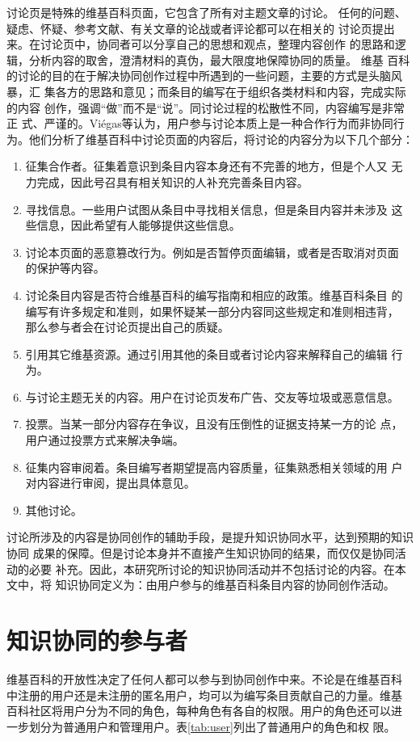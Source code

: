 讨论页是特殊的维基百科页面，它包含了所有对主题文章的讨论。
任何的问题、疑虑、怀疑、参考文献、有关文章的论战或者评论都可以在相关的
讨论页提出来。在讨论页中，协同者可以分享自己的思想和观点，整理内容创作
的思路和逻辑，分析内容的取舍，澄清材料的真伪，最大限度地保障协同的质量。
维基
百科的讨论的目的在于解决协同创作过程中所遇到的一些问题，主要的方式是头脑风暴，汇
集各方的思路和意见；而条目的编写在于组织各类材料和内容，完成实际的内容
创作，强调“做”而不是“说”。同讨论过程的松散性不同，内容编写是非常正
式、严谨的。Viégas等认为，用户参与讨论本质上是一种合作行为而非协同行
为\cite{985765}。他们分析了维基百科中讨论页面的内容后，将讨论的内容分为以下几个部分：
\begin{enumerate}
\item 征集合作者。征集着意识到条目内容本身还有不完善的地方，但是个人又
  无力完成，因此号召具有相关知识的人补充完善条目内容。
\item 寻找信息。一些用户试图从条目中寻找相关信息，但是条目内容并未涉及
  这些信息，因此希望有人能够提供这些信息。
\item 讨论本页面的恶意篡改行为。例如是否暂停页面编辑，或者是否取消对页面
  的保护等内容。
\item 讨论条目内容是否符合维基百科的编写指南和相应的政策。维基百科条目
  的编写有许多规定和准则，如果怀疑某一部分内容同这些规定和准则相违背，
  那么参与者会在讨论页提出自己的质疑。
\item 引用其它维基资源。通过引用其他的条目或者讨论内容来解释自己的编辑
  行为。
\item 与讨论主题无关的内容。用户在讨论页发布广告、交友等垃圾或恶意信息。
\item 投票。当某一部分内容存在争议，且没有压倒性的证据支持某一方的论
  点，用户通过投票方式来解决争端。
\item 征集内容审阅着。条目编写者期望提高内容质量，征集熟悉相关领域的用
  户对内容进行审阅，提出具体意见。
\item 其他讨论。

\end{enumerate}

讨论所涉及的内容是协同创作的辅助手段，是提升知识协同水平，达到预期的知识协同
成果的保障。但是讨论本身并不直接产生知识协同的结果，而仅仅是协同活动的必要
补充。因此，本研究所讨论的知识协同活动并不包括讨论的内容。在本文中，将
知识协同定义为：由用户参与的维基百科条目内容的协同创作活动。

\section{知识协同的参与者}
\label{sec:participants}
维基百科的开放性决定了任何人都可以参与到协同创作中来。不论是在维基百科
中注册的用户还是未注册的匿名用户，均可以为编写条目贡献自己的力量。维基
百科社区将用户分为不同的角色，每种角色有各自的权限。用户的角色还可以进
一步划分为普通用户和管理用户。表\ref{tab:user}列出了普通用户的角色和权
限。



